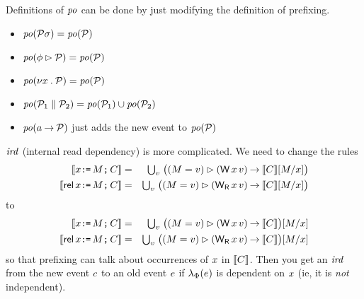 Definitions of $\mathit{po}$ can be done by just modifying the definition of
prefixing.
\begin{itemize}
\item $\mathit{po}(\mathcal{P}\sigma)=\mathit{po}(\mathcal{P})$
\item $\mathit{po}(\phi\mathbin\rhd\mathcal{P})=\mathit{po}(\mathcal{P})$
\item $\mathit{po}(\nu x\mathbin.\mathcal{P})=\mathit{po}(\mathcal{P})$
\item $\mathit{po}(\mathcal{P}_1\parallel\mathcal{P}_2)=\mathit{po}(\mathcal{P}_1)\cup\mathit{po}(\mathcal{P}_2)$
\item $\mathit{po}(a\mathbin\rightarrow\mathcal{P})$ just adds the new event to $\mathit{po}(\mathcal{P})$
\end{itemize}
$\mathit{ird}$ (internal read dependency) is more complicated.
We need to change the rules
\begin{eqnarray*}
  \sem{\aLoc\GETS\aExp\SEMI \aCmd} & = & \textstyle\bigcup_\aVal\; \bigl((\aExp=\aVal) \guard (\DW\aLoc\aVal) \prefix \sem{\aCmd}[\aExp/\aLoc]\bigr) \\
  \sem{\REL\aLoc\GETS\aExp\SEMI \aCmd} & = & \textstyle\bigcup_\aVal\; \bigl((\aExp=\aVal) \guard (\DWRel\aLoc\aVal) \prefix \sem{\aCmd}[\aExp/\aLoc]\bigr) 
\end{eqnarray*}
to
\begin{eqnarray*}
  \sem{\aLoc\GETS\aExp\SEMI \aCmd} & = & \textstyle\bigcup_\aVal\; \bigl((\aExp=\aVal) \guard (\DW\aLoc\aVal) \prefix \sem{\aCmd}\bigr)[\aExp/\aLoc] \\
  \sem{\REL\aLoc\GETS\aExp\SEMI \aCmd} & = & \textstyle\bigcup_\aVal\; \bigl((\aExp=\aVal) \guard (\DWRel\aLoc\aVal) \prefix \sem{\aCmd}\bigr)[\aExp/\aLoc] 
\end{eqnarray*}
so that prefixing can talk about occurrences of $x$ in $\llbracket C\rrbracket$.
Then you get an $\mathit{ird}$ from the new event $c$ to an old event $e$ if
$\lambda_{\Phi}(e)$ is dependent on $x$ (ie, it is \emph{not} independent).


